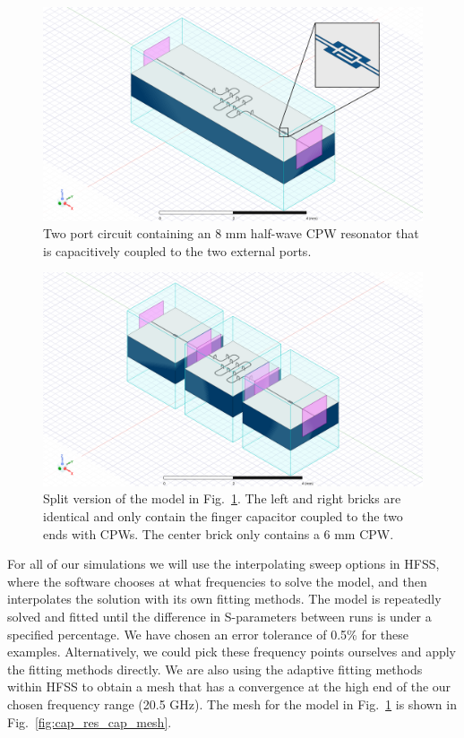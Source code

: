 \begin{figure}[!h]
    \centering
    \includegraphics[width=\textwidth]{figures/cap_res_cap_full.png}
    \caption{Two port circuit containing an 8 mm half-wave CPW resonator that is capacitively coupled to the two external ports.}
    \label{fig:cap_res_cap_full}
\end{figure}

\begin{figure}[!h]
    \centering
    \includegraphics[width=\textwidth]{figures/cap_res_cap_split.png}
    \caption{Split version of the model in Fig.\ \ref{fig:cap_res_cap_full}. The left and right bricks are identical and only contain the finger capacitor coupled to the two ends with CPWs. The center brick only contains a 6 mm CPW.}
    \label{fig:cap_res_cap_split}
\end{figure}

For all of our simulations we will use the interpolating sweep options in HFSS, where the software chooses at what frequencies to solve the model, and then interpolates the solution with its own fitting methods. The model is repeatedly solved and fitted until the difference in S-parameters between runs is under a specified percentage. We have chosen an error tolerance of 0.5\% for these examples. Alternatively, we could pick these frequency points ourselves and apply the fitting methods directly. We are also using the adaptive fitting methods within HFSS to obtain a mesh that has a convergence at the high end of the our chosen frequency range (20.5 GHz). The mesh for the model in Fig.\ \ref{fig:cap_res_cap_full} is shown in Fig.\ \ref{fig:cap_res_cap_mesh}.

